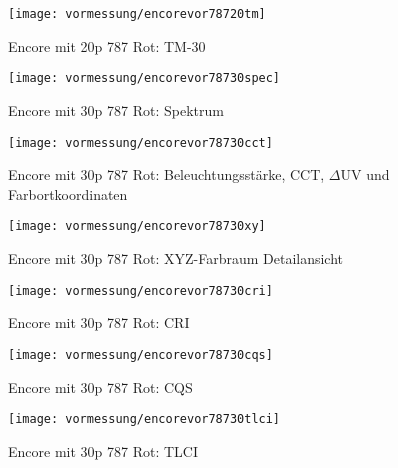 \documentclass[pagesize,paper=A4,fontsize=12pt,utf8,numbers=noenddot,bibliography=totoc,listof=totoc,DIV=11,BCOR=1mm]{scrreprt}
\begin{document}
\begin{figure}[htp]     %
\centering
\texttt{[image: vormessung/encorevor78720tm]} 
\caption {Encore mit 20p 787 Rot: TM-30} 
\end{figure}



\begin{figure}[htp]     %
\centering
\texttt{[image: vormessung/encorevor78730spec]} 
\caption {Encore mit 30p 787 Rot: Spektrum} 
\end{figure}

\begin{figure}[htp]     %
\centering
\texttt{[image: vormessung/encorevor78730cct]} 
\caption {Encore mit 30p 787 Rot: Beleuchtungsstärke, CCT, $\Delta$UV und Farbortkoordinaten} 
\end{figure}

\begin{figure}[htp]     %
\centering
\texttt{[image: vormessung/encorevor78730xy]} 
\caption {Encore mit 30p 787 Rot: XYZ-Farbraum Detailansicht} 
\end{figure}

\begin{figure}[htp]     %
\centering
\texttt{[image: vormessung/encorevor78730cri]} 
\caption {Encore mit 30p 787 Rot: CRI} 
\end{figure}

\begin{figure}[htp]     %
\centering
\texttt{[image: vormessung/encorevor78730cqs]} 
\caption {Encore mit 30p 787 Rot: CQS} 
\end{figure}

\begin{figure}[htp]     %
\centering
\texttt{[image: vormessung/encorevor78730tlci]} 
\caption {Encore mit 30p 787 Rot: TLCI} 
\end{figure}
\end{document}
